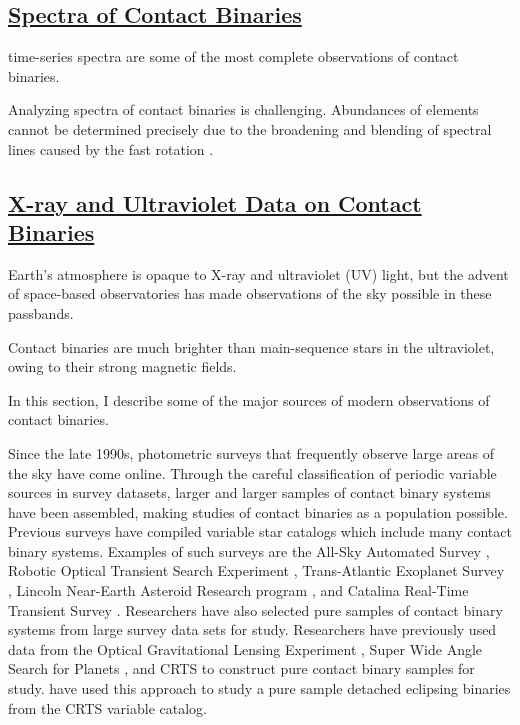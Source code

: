 \documentclass[12pt]{article} %
\numberwithin{equation}{section} %
\begin{document}
\subsection[Spectra of Contact Binaries]{\hyperlink{toc}{Spectra of Contact Binaries}} \label{sec: Spectra of Contact Binaries}

time-series spectra are some of the most complete observations of contact binaries. 

Analyzing spectra of contact binaries is challenging. Abundances of elements cannot be determined precisely due to the broadening and blending of spectral lines caused by the fast rotation \citep{gazeas2006masses}. 

\subsection[X-ray and Ultraviolet Data on Contact Binaries]{\hyperlink{toc}{X-ray and Ultraviolet Data on Contact Binaries}} \label{sec: X-ray and Ultraviolet Data on Contact Binaries}

Earth's atmosphere is opaque to X-ray and ultraviolet (UV) light, but the advent of space-based observatories has made observations of the sky possible in these passbands.

Contact binaries are much brighter than main-sequence stars in the ultraviolet, owing to their strong magnetic fields.


In this section, I describe some of the major sources of modern observations of contact binaries. 

Since the late 1990s, photometric surveys that frequently observe large areas of the sky have come online. Through the careful classification of periodic variable sources in survey datasets, larger and larger samples of contact binary systems have been assembled, making studies of contact binaries as a population possible. Previous surveys have compiled variable star catalogs which include many contact binary systems. Examples of such surveys are the All-Sky Automated Survey \citep[ASAS,][]{pojmanski2000all}, Robotic Optical Transient Search Experiment \citep[ROTSE,][]{akerlof2000rotse}, Trans-Atlantic Exoplanet Survey \citep[TrES,][]{devor2008identification}, Lincoln Near-Earth Asteroid Research program \citep[LINEAR,][]{palaversa2013exploring}, and Catalina Real-Time Transient Survey \citep[CRTS,][]{drake2014catalina}. Researchers have also selected pure samples of contact binary systems from large survey data sets for study. Researchers have previously used data from the Optical Gravitational Lensing Experiment \citep[OGLE,][]{rucinski1996eclipsing}, Super Wide Angle Search for Planets \citep[SuperWASP,][]{norton2011short}, and CRTS \citep{drake2014ultra} to construct pure contact binary samples for study. \citet{lee2015properties} have used this approach to study a pure sample detached eclipsing binaries from the CRTS variable catalog. 
\end{document}
